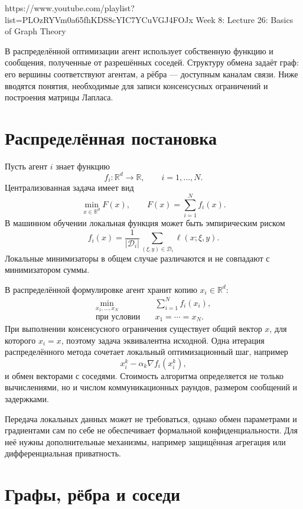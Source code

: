 
\sourcevideo
    {https://www.youtube.com/playlist?list=PLOzRYVm0a65fhKDS8cYIC7YCuVGJ4FOJx}
    {Week 8: Lecture 26: Basics of Graph Theory}

В распределённой оптимизации агент использует собственную функцию и
сообщения, полученные от разрешённых соседей. Структуру обмена задаёт
граф: его вершины соответствуют агентам, а рёбра --- доступным каналам
связи. Ниже вводятся понятия, необходимые для записи консенсусных
ограничений и построения матрицы Лапласа.

\section{Распределённая постановка}

Пусть агент \(i\) знает функцию
\[
    f_i\colon\mathbb R^d\to\mathbb R,
    \qquad
    i=1,\ldots,N.
\]
Централизованная задача имеет вид
\[
    \min_{x\in\mathbb R^d}
    F(x),
    \qquad
    F(x)=\sum_{i=1}^{N}f_i(x).
\]
В машинном обучении локальная функция может быть эмпирическим риском
\[
    f_i(x)
    =
    \frac1{|\mathcal D_i|}
    \sum_{(\xi,y)\in\mathcal D_i}
    \ell(x;\xi,y).
\]
Локальные минимизаторы в общем случае различаются и не совпадают с
минимизатором суммы.

В распределённой формулировке агент хранит копию
\(x_i\in\mathbb R^d\):
\[
\begin{aligned}
    \min_{x_1,\ldots,x_N}\quad
    &\sum_{i=1}^{N}f_i(x_i),
    \\
    \text{при условии}\quad
    &x_1=\cdots=x_N.
\end{aligned}
\]
При выполнении консенсусного ограничения существует общий вектор
\(x\), для которого \(x_i=x\), поэтому задача эквивалентна исходной.
Одна итерация распределённого метода сочетает локальный
оптимизационный шаг, например
\[
    x_i^k-\alpha_k\nabla f_i(x_i^k),
\]
и обмен векторами с соседями. Стоимость алгоритма определяется не
только вычислениями, но и числом коммуникационных раундов, размером
сообщений и задержками.

Передача локальных данных может не требоваться, однако обмен
параметрами и градиентами сам по себе не обеспечивает формальной
конфиденциальности. Для неё нужны дополнительные механизмы, например
защищённая агрегация или дифференциальная приватность.

\section{Графы, рёбра и соседи}

